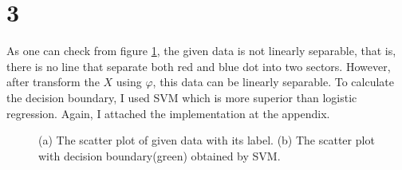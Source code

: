 \documentclass[10pt]{article}
\begin{document}
\section*{3}

As one can check from figure \ref{fig3}, the given data is not linearly separable, that is, there is no line that separate both red and blue dot into two sectors.
However, after transform the $X$ using $\varphi$, this data can be linearly separable. To calculate the decision boundary, I used SVM which is more superior than logistic regression.
Again, I attached the implementation at the appendix. 
\begin{figure}[!h]
    \begin{center}
    \end{center}
    \caption{(a) The scatter plot of given data with its label. (b) The scatter plot with decision boundary(green) obtained by SVM.}
    \label{fig3}
\end{figure}
\end{document}
